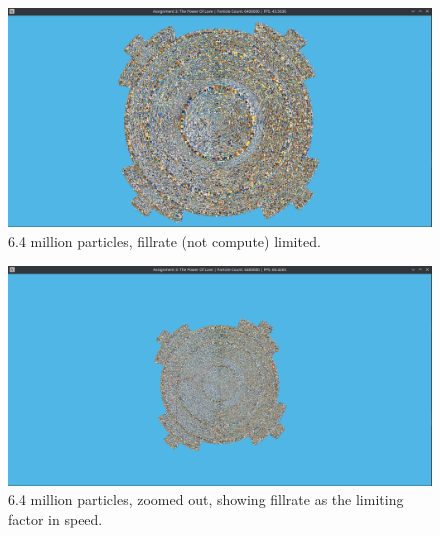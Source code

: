 \documentclass[]{report}
\begin{document}
\begin{figure}
	\centering
	\centerline{\includegraphics[width=1.6\linewidth]{screenshot004}}
	\caption{6.4 million particles, fillrate (not compute) limited.}
	\label{fig:phyiscsrend}
\end{figure}

\begin{figure}
	\centering
	\centerline{\includegraphics[width=1.6\linewidth]{screenshot005}}
	\caption{6.4 million particles, zoomed out, showing fillrate as the limiting factor in speed.}
	\label{fig:phyiscsrendfill}
\end{figure}



\nocite{*}



\end{document}
